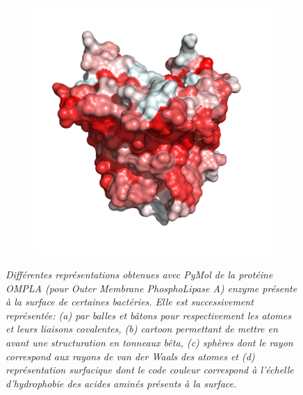 \begin{figure}
\begin{subfigure}{.5\textwidth}
  \caption{}
    \label{Fig:vdw_representation}
  \end{subfigure}%
  \begin{subfigure}{.5\textwidth}
  \centering
  {\includegraphics[width=0.9\linewidth]{./figures/ch1/surface_representation}}
  \caption{}
    \label{Fig:surface_representation}
  \end{subfigure}%
  \caption{\it Différentes représentations obtenues avec PyMol de la protéine OMPLA (pour \textit{Outer Membrane PhosphoLipase A}) enzyme présente à la surface de certaines bactéries. Elle est successivement représentée: (a) par balles et bâtons pour respectivement les atomes et leurs liaisons covalentes, (b) \textit{cartoon} permettant de mettre en avant une structuration en \textit{tonneaux bêta}, (c) sphères dont le rayon correspond aux rayons de van der Waals des atomes et (d) représentation surfacique dont le code couleur correspond à l'échelle d'hydrophobie des acides aminés présents à la surface.
  }
\end{figure}

